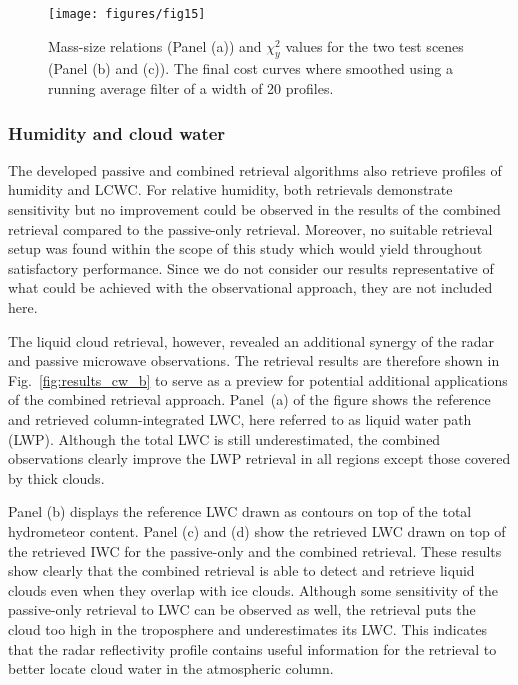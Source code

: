 \documentclass[journal abbreviation, manuscript]{copernicus}
\begin{document}
\begin{figure}[!h]
\centering
\texttt{[image: figures/fig15]}
\caption{Mass-size relations (Panel (a)) and $\chi^2_y$ values for the two test
  scenes (Panel (b) and (c)). The final cost curves where smoothed using a
  running average filter of a width of 20 profiles.}
\label{fig:costs}
\end{figure}


\subsubsection{Humidity and cloud water}

The developed passive and combined retrieval algorithms also retrieve profiles
of humidity and LCWC. For relative humidity, both retrievals demonstrate
sensitivity but no improvement could be observed in the results of the combined
retrieval compared to the passive-only retrieval. Moreover, no suitable
retrieval setup was found within the scope of this study which would yield
throughout satisfactory performance. Since we do not consider our results
representative of what could be achieved with the observational approach, they
are not included here.

The liquid cloud retrieval, however, revealed an additional synergy of the radar
and passive microwave observations. The retrieval results are therefore shown in
Fig.~\ref{fig:results_cw_b} to serve as a preview for potential additional
applications of the combined retrieval approach. Panel~(a) of the figure shows
the reference and retrieved column-integrated LWC, here referred to as liquid
water path (LWP). Although the total LWC is still underestimated, the combined
observations clearly improve the LWP retrieval in all regions except those covered
by thick clouds.

Panel (b) displays the reference LWC drawn as contours on top of the total
hydrometeor content. Panel (c) and (d) show the retrieved LWC drawn on top of
the retrieved IWC for the passive-only and the combined retrieval. These results
show clearly that the combined retrieval is able to detect and retrieve liquid
clouds even when they overlap with ice clouds. Although some sensitivity of the
passive-only retrieval to LWC can be observed as well, the retrieval puts the
cloud too high in the troposphere and underestimates its LWC. This indicates
that the radar reflectivity profile contains useful information for the
retrieval to better locate cloud water in the atmospheric column.
\end{document}
